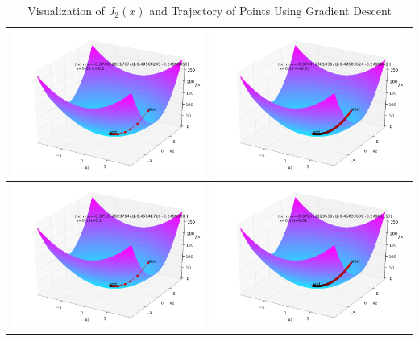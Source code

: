 \begin{itemize}
\begin{table}[ht]
\centering
\begin{tabular}{|c|c|}
\hline
\includegraphics[width=8cm]{J2_1.png}&\includegraphics[width=8cm]{J2_2.png}\\
\hline
\includegraphics[width=8cm]{J2_3.png}&\includegraphics[width=8cm]{J2_4.png}\\
\hline
\end{tabular}
\caption{Visualization of $J_2(x)$ and Trajectory of Points Using Gradient Descent}
\label{J2}
\end{table}


\end{itemize}
